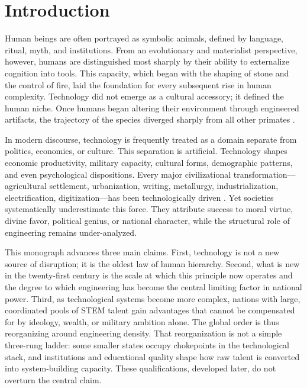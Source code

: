 \documentclass[12pt,letterpaper]{article}
\begin{document}
\section{Introduction}

Human beings are often portrayed as symbolic animals, defined by language, ritual, myth, and institutions. From an evolutionary and materialist perspective, however, humans are distinguished most sharply by their ability to externalize cognition into tools. This capacity, which began with the shaping of stone and the control of fire, laid the foundation for every subsequent rise in human complexity. Technology did not emerge as a cultural accessory; it defined the human niche. Once humans began altering their environment through engineered artifacts, the trajectory of the species diverged sharply from all other primates \cite{mithen1996,gamble2013}.

In modern discourse, technology is frequently treated as a domain separate from politics, economics, or culture. This separation is artificial. Technology shapes economic productivity, military capacity, cultural forms, demographic patterns, and even psychological dispositions. Every major civilizational transformation---agricultural settlement, urbanization, writing, metallurgy, industrialization, electrification, digitization---has been technologically driven \cite{diamond1997,arthur2009}. Yet societies systematically underestimate this force. They attribute success to moral virtue, divine favor, political genius, or national character, while the structural role of engineering remains under-analyzed.

This monograph advances three main claims. First, technology is not a new source of disruption; it is the oldest law of human hierarchy. Second, what is new in the twenty-first century is the scale at which this principle now operates and the degree to which engineering has become the central limiting factor in national power. Third, as technological systems become more complex, nations with large, coordinated pools of STEM talent gain advantages that cannot be compensated for by ideology, wealth, or military ambition alone. The global order is thus reorganizing around engineering density. That reorganization is not a simple three-rung ladder: some smaller states occupy chokepoints in the technological stack, and institutions and educational quality shape how raw talent is converted into system-building capacity. These qualifications, developed later, do not overturn the central claim.
\end{document}

